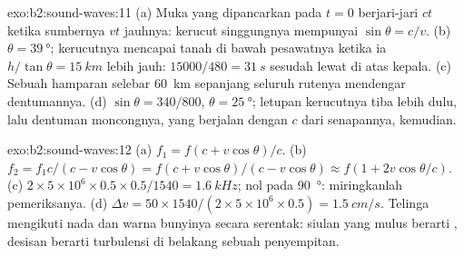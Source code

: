 \begin{solution}{exo:b2:sound-waves:11}
(a) Muka yang dipancarkan pada $t = 0$ berjari-jari $ct$ ketika sumbernya $vt$
jauhnya: kerucut singgungnya mempunyai $\sin\theta = c/v$. (b) $\theta = \qty{39}{\degree}$; kerucutnya
mencapai tanah di bawah pesawatnya ketika ia $h/\tan\theta = \qty{15}{km}$
lebih jauh: $15000/480 = \qty{31}{s}$ sesudah lewat di atas kepala. (c) Sebuah
hamparan selebar \qty{60}{km} sepanjang seluruh rutenya mendengar dentumannya. (d) $\sin\theta
= 340/800$, $\theta = \qty{25}{\degree}$; letupan kerucutnya tiba lebih dulu, lalu
dentuman moncongnya, yang berjalan dengan $c$ dari senapannya, kemudian.
\end{solution}

\begin{solution}{exo:b2:sound-waves:12}
(a) $f_1 = f(c + v\cos\theta)/c$. (b) $f_2 = f_1c/(c - v\cos\theta) = f(c + v\cos\theta)
/(c - v\cos\theta) \approx f(1 + 2v\cos\theta/c)$. (c) $2 \times 5 \times 10^6 \times 0.5 \times 0.5/1540
= \qty{1.6}{kHz}$; nol pada \qty{90}{\degree}: miringkanlah pemeriksanya. (d) $\Delta v = 50 \times 1540/
(2 \times 5 \times 10^6 \times 0.5) = \qty{1.5}{cm/s}$. Telinga mengikuti nada dan warna bunyinya
secara serentak: siulan yang mulus berarti , desisan berarti turbulensi
di belakang sebuah penyempitan.
\end{solution}

